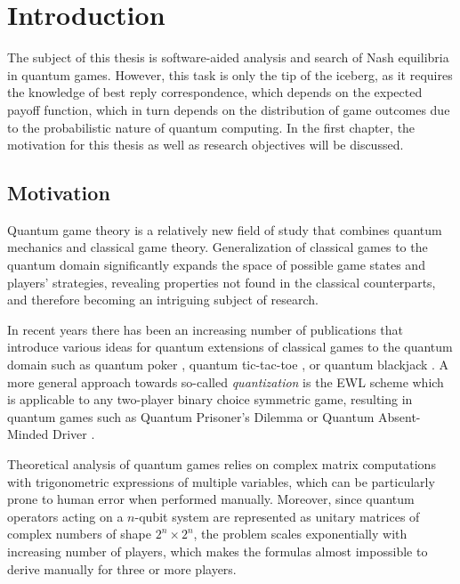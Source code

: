 \documentclass[../main.tex]{subfiles}
\begin{document}
\setcounter{chapter}{0}
\chapter{Introduction}
\label{chap:1}

The subject of this thesis is software-aided analysis and search of Nash equilibria in quantum games. However, this task is only the tip of the iceberg, as it requires the knowledge of best reply correspondence, which depends on the expected payoff function, which in turn depends on the distribution of game outcomes due to the probabilistic nature of quantum computing. In the first chapter, the motivation for this thesis as well as research objectives will be discussed.

\section{Motivation}

Quantum game theory is a relatively new field of study that combines quantum mechanics and classical game theory. Generalization of classical games to the quantum domain significantly expands the space of possible game states and players' strategies, revealing properties not found in the classical counterparts, and therefore becoming an intriguing subject of research.

In recent years there has been an increasing number of publications that introduce various ideas for quantum extensions of classical games to the quantum domain such as quantum poker \cite{fuchs2020quantum}, quantum tic-tac-toe \cite{goff2006quantum}, or quantum blackjack \cite{mura2021quantization}. A more general approach towards so-called \emph{quantization} is the EWL scheme \cite{eisert1999quantum} which is applicable to any two-player binary choice symmetric game, resulting in quantum games such as Quantum Prisoner's Dilemma \cite{eisert1999quantum,chen2006well,Szopa_2014,szopa2021efficiency} or Quantum Absent-Minded Driver \cite{frackiewicz2022quantum}.

Theoretical analysis of quantum games relies on complex matrix computations with trigonometric expressions of multiple variables, which can be particularly prone to human error when performed manually. Moreover, since quantum operators acting on a $n$-qubit system are represented as unitary matrices of complex numbers of shape $2^n \times 2^n$, the problem scales exponentially with increasing number of players, which makes the formulas almost impossible to derive manually for three or more players.
\end{document}
